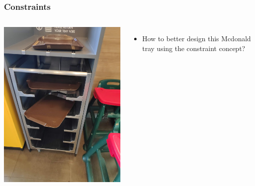 \documentclass{beamer}
\begin{document}
\begin{frame}
\frametitle{Constraints}
\begin{columns}[c] %
	
	\centering
	\includegraphics[width=0.7\linewidth]{mc}
	
	\begin{itemize}
		\item How to better design this Mcdonald tray using the constraint concept?
	\end{itemize}
\end{columns}
\end{frame}

%	
\end{document}
